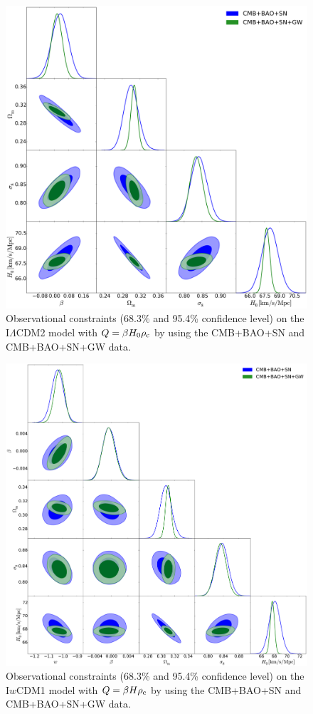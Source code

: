 \documentclass[aps,prd,nofootinbib,amsmath,amssymb,superscriptaddress,twocolumn,10pt]{revtex4}%
\begin{document}
\begin{figure}[!htp]
\includegraphics[scale=0.25]{ilcdmh0pc.pdf}

\centering \caption{\label{fig2} Observational constraints (68.3\% and 95.4\% confidence level) on the I$\Lambda$CDM2 model with $Q=\beta H_{0} \rho_{\rm c}$ by using the CMB+BAO+SN and CMB+BAO+SN+GW data.}
\end{figure}
\begin{figure}[!htp]
\includegraphics[scale=0.25]{iwcdmhpc.pdf}

\centering \caption{\label{fig3} Observational constraints (68.3\% and 95.4\% confidence level) on the I$w$CDM1 model with $Q=\beta H \rho_{\rm c}$ by using the CMB+BAO+SN and CMB+BAO+SN+GW data.}
\end{figure}
\end{document}
